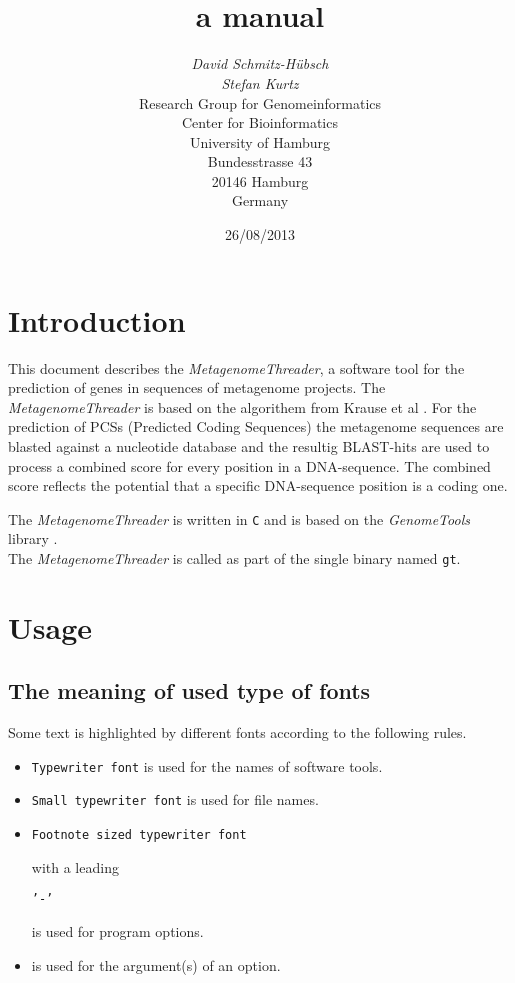 \documentclass[12pt,titlepage]{article}
\title{\MetagenomeThreader\\
a manual}
\author{\begin{tabular}{c}
         \textit{David Schmitz-H\"{u}bsch}\\
         \textit{Stefan Kurtz}\\[1cm]
         Research Group for Genomeinformatics\\
         Center for Bioinformatics\\
         University of Hamburg\\
         Bundesstrasse 43\\
         20146 Hamburg\\
         Germany\\[1cm]
        \end{tabular}}
\date{26/08/2013}
\newcommand{\MetagenomeThreader}{\textit{MetagenomeThreader}\xspace}
\newcommand{\GenomeTools}{\textit{GenomeTools}\xspace}
\newcommand{\Gt}{\texttt{gt}\xspace}
\begin{document}
\maketitle



\section{Introduction} \label{Introduction}

This document describes the \MetagenomeThreader, a software tool
for the prediction of genes in sequences of metagenome projects.
The \MetagenomeThreader is based on the algorithem from Krause et al \cite{krause}.
For the prediction of PCSs (Predicted Coding Sequences) the metagenome sequences are
blasted against a nucleotide database and the resultig BLAST-hits are used to
process a combined score for every position in a DNA-sequence. The combined score
reflects the potential that a specific DNA-sequence position is a coding one.

The \MetagenomeThreader is written in \texttt{C} and is based 
on the \GenomeTools library \cite{genometools}.
\\
The \MetagenomeThreader is called as part of the single binary named \Gt. 

\section{Usage} \label{Usage}

\subsection{The meaning of used type of fonts} \label{Fonts}
Some text is highlighted by different fonts according to the following rules.

\begin{itemize}
\item \texttt{Typewriter font} is used for the names of software tools.
\item \texttt{\small{Small typewriter font}} is used for file names.
\item \begin{footnotesize}\texttt{Footnote sized typewriter font}
      \end{footnotesize} with a leading 
      \begin{footnotesize}\texttt{'-'}\end{footnotesize} 
      is used for program options.
\item {} is used for the argument(s) of an
      option.
\end{itemize}
\end{document}
